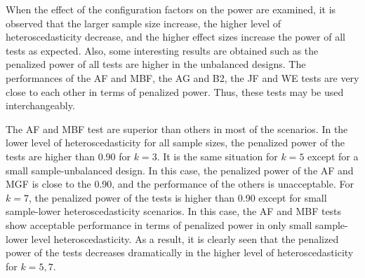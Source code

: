 When the effect of the configuration factors on the power are examined, it is observed that the larger sample size increase, the higher level of heteroscedasticity decrease, and the higher effect sizes increase the power of all tests as expected. Also, some interesting results are obtained such as the penalized power of all tests are higher in the unbalanced designs. The performances of the AF and MBF, the AG and B2, the JF and WE tests are very close to each other in terms of penalized power. Thus, these tests may be used interchangeably. 

The AF and MBF test are superior than others in most of the scenarios. In the lower level of heteroscedasticity for all sample sizes, the penalized power of the tests are higher than 0.90 for $k=3$. It is the same situation for $k=5$ except for a small sample-unbalanced design. In this case, the penalized power of the AF and MGF is close to the 0.90, and the performance of the others is unacceptable. For $k=7$, the penalized power of the tests is higher than 0.90 except for small sample-lower heteroscedasticity scenarios. In this case, the AF and MBF tests show acceptable performance in terms of penalized power in only small sample-lower level heteroscedasticity. As a result, it is clearly seen that the penalized power of the tests decreases dramatically in the higher level of heteroscedasticity for $k=5, 7$. 

